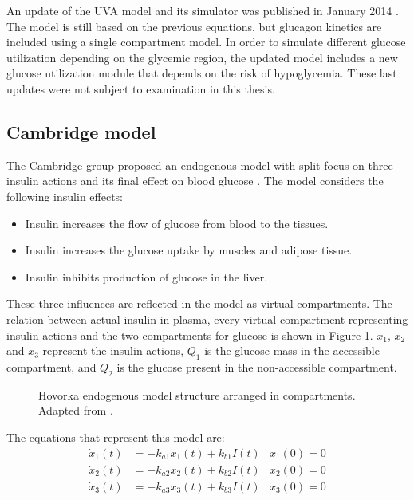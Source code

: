 An update of the UVA model and its simulator was published in January 2014 \cite{dalla2014uva}. The model is still based on the previous equations, but glucagon kinetics are included using a single compartment model. In order to simulate different glucose utilization depending on the glycemic region, the updated model includes a new glucose utilization module that depends on the risk of hypoglycemia. These last updates were not subject to examination in this thesis.

\subsection{Cambridge model}
\label{sec:HovorkaEtAl}

The Cambridge group proposed an endogenous model with split focus on three insulin actions and its final effect on blood glucose \cite{hovorka2002partitioning}. The model considers the following insulin effects:
\begin{itemize}
  \item Insulin increases the flow of glucose from blood to the tissues.
  \item Insulin increases the glucose uptake by muscles and adipose tissue.
  \item Insulin inhibits production of glucose in the liver.
\end{itemize}
These three influences are reflected in the model as virtual compartments. The relation between actual insulin in plasma, every virtual compartment representing insulin actions and the two compartments for glucose is shown in Figure \ref{fig:hovorka}. $x_{1}$, $x_{2}$ and $x_{3}$ represent the insulin actions, $Q_{1}$ is the glucose mass in the accessible compartment, and $Q_{2}$ is the glucose present in the non-accessible compartment. 

\begin{figure}[hbtp]
\centering
{}\caption{Hovorka endogenous model structure arranged in compartments. Adapted from \cite{hovorka2002partitioning}.}
\label{fig:hovorka}
\end{figure}

The equations that represent this model are:
\begin{align}
  \dot{x}_{1}(t) &= -k_{a1}x_{1}(t) + k_{b1}I(t) &  x_{1}(0)=0 \label{eq:hovorka1} \\
  \dot{x}_{2}(t) &= -k_{a2}x_{2}(t) + k_{b2}I(t) &  x_{2}(0)=0 \label{eq:hovorka2} \\
  \dot{x}_{3}(t) &= -k_{a3}x_{3}(t) + k_{b3}I(t) &  x_{3}(0)=0 \label{eq:hovorka3}
\end{align}

